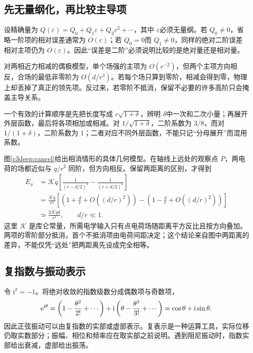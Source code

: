 \subsection{先无量纲化，再比较主导项}
设精确量为 $Q(\varepsilon)=Q_0+Q_1\varepsilon+Q_2\varepsilon^2+\cdots$，其中 $\varepsilon$必须无量纲。若 $Q_0\ne0$，省略一阶项的相对误差通常为 $O(\varepsilon)$；若 $Q_0=0$而 $Q_1\ne0$，同样的绝对二阶误差相对主项仍为 $O(\varepsilon)$。因此“误差是二阶”必须说明比较的是绝对量还是相对量。

对两相近力相减的偶极模型，单个场强的主项为 $O(r^{-2})$，但两个主项方向相反，合场的最低非零阶为 $O(d/r^3)$。若每个场只算到零阶，相减会得到零，物理上却丢掉了真正的领先项。反过来，若零阶不抵消，保留不必要的许多高阶只会掩盖主导关系。

一个有效的计算顺序是先把长度写成 $r\sqrt{1+\delta}$，辨明 $\delta$中一次和二次小量；再展开外层函数，最后将各项相加或相减。对 $1/\sqrt{1+\delta}$，二阶系数为 $3/8$，而对 $1/(1+\delta)$，二阶系数为 $1$；二者对应不同外层函数，不能只记“分母展开”而混用系数。




图\ref{c3deep:cancel}给出相消情形的具体几何模型。在轴线上远处的观察点 $P$，两电荷的场都近似与 $q/r^2$ 同阶，但方向相反。保留两距离的区别，才得到
\begin{align*}
 E_x&=\mathcal Kq\left[\frac1{(r-d/2)^2}-\frac1{(r+d/2)^2}\right]\\
 &=\frac{\mathcal Kq}{r^2}\left[\left(1+\frac dr+O((d/r)^2)\right)-\left(1-\frac dr+O((d/r)^2)\right)\right]\\
 &\simeq\frac{2\mathcal Kqd}{r^3},\qquad d/r\ll1.
\end{align*}
这里 $\mathcal K$ 是库仑常量，所需电学输入只有点电荷场随距离平方反比且按方向叠加。两项的零阶部分抵消，首个不抵消项由电荷间距决定；这个结论来自图中两距离的差异，不能仅凭“远处”把两距离先设成完全相等。


\subsection{复指数与振动表示}
令 $\mathrm i^2=-1$。将绝对收敛的指数级数分成偶数项与奇数项，
\[
 \mathrm e^{\mathrm i\theta}
 =\left(1-\frac{\theta^2}{2!}+\cdots\right)
 +\mathrm i\left(\theta-\frac{\theta^3}{3!}+\cdots\right)
 =\cos\theta+\mathrm i\sin\theta.
\]
因此正弦振动可以由复指数的实部或虚部表示。复表示是一种运算工具，实际位移仍取实数部分；振幅、相位和频率应在取实部之前说明。遇到阻尼振动时，指数实部给出衰减，虚部给出振荡。

